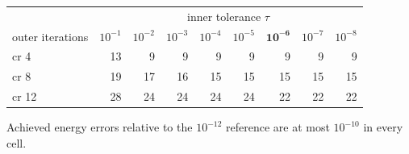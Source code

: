{\small
\begin{tabular}{lrrrrrrrr}
\toprule
& \multicolumn{8}{c}{inner tolerance $\tau$} \\
outer iterations & $10^{-1}$ & $10^{-2}$ & $10^{-3}$ & $10^{-4}$ & $10^{-5}$ & $\mathbf{10^{-6}}$ & $10^{-7}$ & $10^{-8}$ \\
\midrule
cr 4 & 13 & 9 & 9 & 9 & 9 & 9 & 9 & 9 \\
cr 8 & 19 & 17 & 16 & 15 & 15 & 15 & 15 & 15 \\
cr 12 & 28 & 24 & 24 & 24 & 24 & 22 & 22 & 22 \\
\bottomrule
\end{tabular}
\par\smallskip
{\footnotesize Achieved energy errors relative to the $10^{-12}$ reference are at most $10^{-10}$ in every cell.}
}
